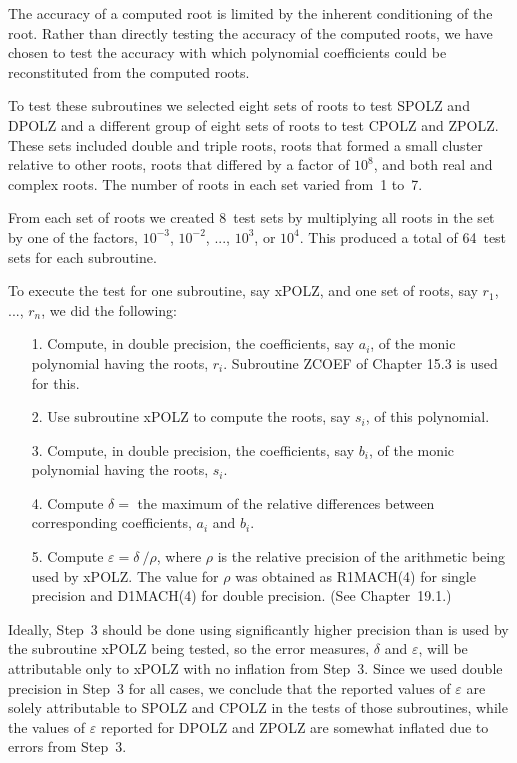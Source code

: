 \documentclass[twoside]{MATH77}
\begin{document}
The accuracy of a computed root is limited by the inherent conditioning of
the root. Rather than directly testing the accuracy of the computed roots,
we have chosen to test the accuracy with which polynomial coefficients could
be reconstituted from the computed roots.

To test these subroutines we selected eight sets of roots to test SPOLZ and
DPOLZ and a different group of eight sets of roots to test CPOLZ and ZPOLZ.
These sets included double and triple roots, roots that formed a small
cluster relative to other roots, roots that differed by a factor of $10^8$,
and both real and complex roots. The number of roots in each set varied
from~1 to~7.

From each set of roots we created 8~test sets by multiplying all roots in
the set by one of the factors, $10^{-3}$, $10^{-2}$, ..., $10^3$, or $10^4$.
This produced a total of 64~test sets for each subroutine.

To execute the test for one subroutine, say xPOLZ, and one set of roots, say
$r_1$, ..., $r_n$, we did the following:

\begin{itemize}
\item[1.]  Compute, in double precision, the coefficients, say $a_i$, of the
monic polynomial having the roots, $r_i$.  Subroutine ZCOEF of
Chapter 15.3 is used for this.

\item[2.]  Use subroutine xPOLZ to compute the roots, say $s_i$, of this
polynomial.

\item[3.]  Compute, in double precision, the coefficients, say $b_i$, of the
monic polynomial having the roots, $s_i.$

\item[4.]  Compute $\delta =$ the maximum of the relative differences
between corresponding coefficients, $a_i$ and $b_i.$

\item[5.]  Compute $\varepsilon =\delta \ /\rho $, where $\rho $ is the
relative precision of the arithmetic being used by xPOLZ. The value for $%
\rho $ was obtained as R1MACH(4) for single precision and D1MACH(4) for
double precision.  (See Chapter~19.1.)
\end{itemize}

Ideally, Step~3 should be done using significantly higher precision than is
used by the subroutine xPOLZ being tested, so the error measures, $\delta $
and $\varepsilon $, will be attributable only to xPOLZ with no inflation
from Step~3. Since we used double precision in Step~3 for all cases, we
conclude that the reported values of $\varepsilon $ are solely attributable
to SPOLZ and CPOLZ in the tests of those subroutines, while the values of $%
\varepsilon $ reported for DPOLZ and ZPOLZ are somewhat inflated due to
errors from Step~3.
\end{document}
